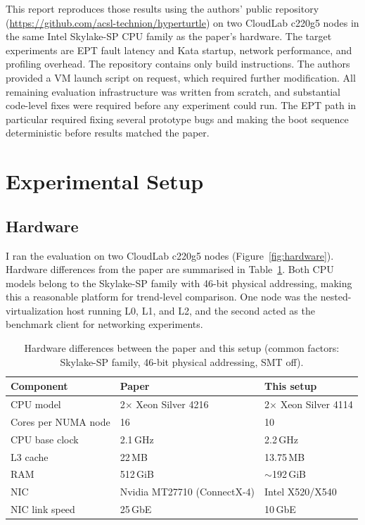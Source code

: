 \documentclass[11pt]{article}
\begin{document}
This report reproduces those results using the authors' public repository (\url{https://github.com/acsl-technion/hyperturtle}) on two CloudLab c220g5 nodes in the same Intel Skylake-SP CPU family as the paper's hardware. The target experiments are EPT fault latency and Kata startup, network performance, and profiling overhead. The repository contains only build instructions. The authors provided a VM launch script on request, which required further modification. All remaining evaluation infrastructure was written from scratch, and substantial code-level fixes were required before any experiment could run. The EPT path in particular required fixing several prototype bugs and making the boot sequence deterministic before results matched the paper.

\section{Experimental Setup}

\subsection{Hardware}

I ran the evaluation on two CloudLab c220g5 nodes (Figure~\ref{fig:hardware}). Hardware differences from the paper are summarised in Table~\ref{tab:hardware}. Both CPU models belong to the Skylake-SP family with 46-bit physical addressing, making this a reasonable platform for trend-level comparison. One node was the nested-virtualization host running L0, L1, and L2, and the second acted as the benchmark client for networking experiments.

\begin{table}[H]
    \centering
    \caption{Hardware differences between the paper and this setup (common factors: Skylake-SP family, 46-bit physical addressing, SMT off).}
    \label{tab:hardware}
    \begin{tabular}{lll}
        \toprule
        Component & Paper & This setup \\
        \midrule
        CPU model & 2$\times$ Xeon Silver 4216 & 2$\times$ Xeon Silver 4114 \\
        Cores per NUMA node & 16 & 10 \\
        CPU base clock & 2.1\,GHz & 2.2\,GHz \\
        L3 cache & 22\,MB & 13.75\,MB \\
        RAM & 512\,GiB & $\sim$192\,GiB \\
        NIC & Nvidia MT27710 (ConnectX-4) & Intel X520/X540 \\
        NIC link speed & 25\,GbE & 10\,GbE \\
        \bottomrule
    \end{tabular}
\end{table}
\end{document}
